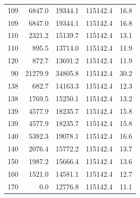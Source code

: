 \begin{table}[htbp]
\begin{tabular}{rrrrr}
    109 & \num{6847.0} & \num{19344.1} & \num{115142.4} & 16.8 \\
    109 & \num{6847.0} & \num{19344.1} & \num{115142.4} & 16.8 \\
    110 & \num{2321.2} & \num{15139.7} & \num{115142.4} & 13.1 \\
    110 & \num{895.5} & \num{13714.0} & \num{115142.4} & 11.9 \\
    120 & \num{872.7} & \num{13691.2} & \num{115142.4} & 11.9 \\
    90 & \num{21279.9} & \num{34805.8} & \num{115142.4} & 30.2 \\
    138 & \num{682.7} & \num{14163.3} & \num{115142.4} & 12.3 \\
    138 & \num{1769.5} & \num{15250.1} & \num{115142.4} & 13.2 \\
    139 & \num{4577.9} & \num{18235.7} & \num{115142.4} & 15.8 \\
    139 & \num{4577.9} & \num{18235.7} & \num{115142.4} & 15.8 \\
    140 & \num{5382.3} & \num{19078.1} & \num{115142.4} & 16.6 \\
    140 & \num{2076.4} & \num{15772.2} & \num{115142.4} & 13.7 \\
    150 & \num{1987.2} & \num{15666.4} & \num{115142.4} & 13.6 \\
    160 & \num{1521.0} & \num{14581.1} & \num{115142.4} & 12.7 \\
    170 & \num{0.0} & \num{12776.8} & \num{115142.4} & 11.1 \\
    \bottomrule
  \end{tabular}
\end{table}
